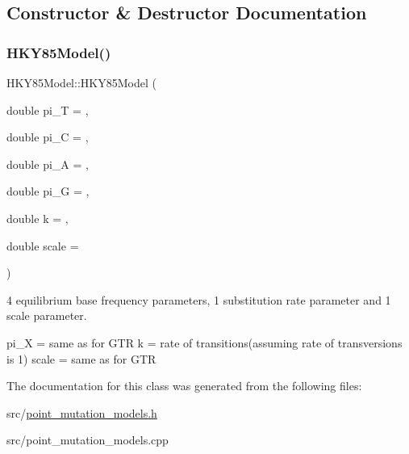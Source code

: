 \subsection{Constructor \& Destructor Documentation}
\mbox{\label{classretrocombinator_1_1HKY85Model_a2f4a296cdc444c92b54a4d972b044cdb}} 
\subsubsection{\texorpdfstring{H\+K\+Y85\+Model()}{HKY85Model()}}
{\footnotesize\ttfamily H\+K\+Y85\+Model\+::\+H\+K\+Y85\+Model (\begin{DoxyParamCaption}\item[{double}]{pi\+\_\+T = {},  }\item[{double}]{pi\+\_\+C = {},  }\item[{double}]{pi\+\_\+A = {},  }\item[{double}]{pi\+\_\+G = {},  }\item[{double}]{k = {},  }\item[{double}]{scale = {} }\end{DoxyParamCaption})}



4 equilibrium base frequency parameters, 1 substitution rate parameter and 1 scale parameter. 

pi\+\_\+X = same as for G\+TR k = rate of transitions(assuming rate of transversions is 1) scale = same as for G\+TR 

The documentation for this class was generated from the following files\+:\begin{DoxyCompactItemize}
\item 
src/\hyperlink{point__mutation__models_8h}{point\+\_\+mutation\+\_\+models.\+h}\item 
src/point\+\_\+mutation\+\_\+models.\+cpp\end{DoxyCompactItemize}
